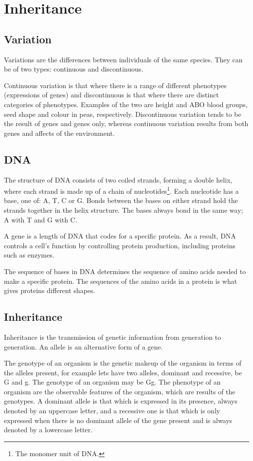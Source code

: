 \section{Inheritance}
\subsection{Variation}

Variations are the differences between individuals of the same species. They can be of two types:
continuous and discontinuous. 

Continuous variation is that where there is a range of different phenotypes (expressions of genes)
and discontinuous is that where there are distinct categories of phenotypes. Examples of the two
are height and ABO blood groups, seed shape and colour in peas, respectively. Discontinuous 
variation tends to be the result of genes and genes only, whereas continuous variation results from
both genes and affects of the environment.

\subsection{DNA}

The structure of DNA consists of two coiled strands, forming a double helix, where each strand is
made up of a chain of nucleotides\footnote{The monomer unit of DNA.}. Each nucleotide has a base,
one of: A, T, C or G. Bonds between the bases on either strand hold the strands together in the
helix structure. The bases always bond in the same way; A with T and G with C.

A gene is a length of DNA that codes for a specific protein. As a result, DNA controls a cell's
function by controlling protein production, including proteins such as enzymes. 

The sequence of bases in DNA determines the sequence of amino acids needed to make a specific
protein. The sequences of the amino acids in a protein is what gives proteins different shapes.

\subsection{Inheritance}

Inheritance is the transmission of genetic information from generation to generation. An allele is
an alternative form of a gene.

The genotype of an organism is the genetic makeup of the organism in terms of the alleles present,
for example lets have two alleles, dominant and recessive, be G and g. The genotype of an organism
may be Gg. The phenotype of an organism are the observable features of the organism, which are
results of the genotypes. A dominant allele is that which is expressed in its presence, always
denoted by an uppercase letter, and a
recessive one is that which is only expressed when there is no dominant allele of the gene present
and is always denoted by a lowercase letter.

